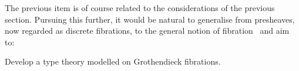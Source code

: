 \documentclass[11pt,twocolumn]{article}
\newcounter{CC}
\newenvironment{resenumerate}
  {\begin{list}{[\textbf{\arabic{CC}]}}
  {\usecounter{CC}
   \setlength{\topsep}{2pt}
   \setlength{\partopsep}{2pt}
   \setlength{\itemsep}{2.5pt}
   \setlength{\parsep}{2.5pt}
   \setlength{\leftmargin}{1.65em}
   \setlength{\labelwidth}{1.15em}
 }}
  {\end{list}}
\newcommand{\hide}[1]{}
\begin{document}
The previous item is of course related to the considerations of the
previous section.  Pursuing this further, it would be natural to
generalise from presheaves, now regarded as discrete fibrations, to the
general notion of fibration~\cite{SGA1} and aim to:
\begin{resenumerate}\setcounter{CC}{3}
\item
  Develop a type theory modelled on Grothendieck fibrations.
\end{resenumerate}

\hide{
As a final point, we note that yet another approach would be to:
\begin{resenumerate}\setcounter{CC}{4}
\item
  Investigate a directed-cylinder construction, intuitively adding a new base
  point to a type that canonically evolves to every element.  
\end{resenumerate}
This would generalise the lifting construction of Domain
Theory~\cite{LiftingKZ} and possibly establish connections with the
Complete Cuboidal Sets model of Axiomatic Domain
Theory~\cite{CompleteCuboidalSets} opening new directions.  
}
\end{document}
